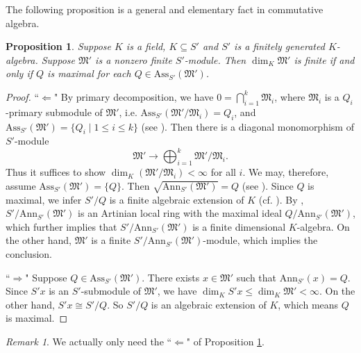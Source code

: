 \documentclass[12pt]{amsart}
\theoremstyle{plain}
\newtheorem{proposition}[theorem]{Proposition}
\theoremstyle{definition}
\theoremstyle{question}
\theoremstyle{remark}
\newtheorem{remark}[theorem]{Remark}
\theoremstyle{assumption}
\numberwithin{equation}{section}
\theoremstyle{bigthm}
\begin{document}
The following proposition is a general and elementary fact in commutative algebra.
\begin{proposition}\label{prop_ideal_dim_zero}
Suppose $K$ is a field, $K \subseteq S'$ and $S'$ is a finitely generated $K$-algebra. Suppose $\mathfrak{M}'$ is a nonzero finite $S'$-module. Then $\dim_{K} \mathfrak{M}'$ is finite if and only if $Q$ is maximal for each $Q \in \mathrm{Ass}_{S'} (\mathfrak{M}')$.
\end{proposition}
\begin{proof}
``$\Leftarrow$" By primary decomposition, we have $0= \bigcap_{i=1}^{k} \mathfrak{M}_{i}$, where $\mathfrak{M}_{i}$ is a $Q_{i}$-primary submodule of $\mathfrak{M}'$, i.e. $\mathrm{Ass}_{S'} (\mathfrak{M}'/\mathfrak{M}_{i}) = Q_{i}$, and $\mathrm{Ass}_{S'} (\mathfrak{M}') = \{ Q_{i} \mid 1 \leq i \leq k \}$ (see \cite[(8.G)]{Matsumura1}). Then there is a diagonal monomorphism of $S'$-module
\[
\mathfrak{M}' \rightarrow \bigoplus_{i=1}^{k} \mathfrak{M}'/\mathfrak{M}_{i}.
\]
Thus it suffices to show $\dim_{K} (\mathfrak{M}'/\mathfrak{M}_{i}) < \infty$ for all $i$. We may, therefore, assume $\mathrm{Ass}_{S'} (\mathfrak{M}') = \{ Q \}$. Then $\sqrt{\mathrm{Ann}_{S'} (\mathfrak{M}')} = Q$ (see \cite[Theorem~6.6]{Matsumura2}). Since $Q$ is maximal, we infer $S'/Q$ is a finite algebraic extension of $K$ (cf. \cite[I.~\S1]{Mumford}). By \cite[Proposition~8.6]{Atiyah_Macdonald}, $S'/ \mathrm{Ann}_{S'} (\mathfrak{M}')$ is an Artinian local ring with the maximal ideal $Q/ \mathrm{Ann}_{S'} (\mathfrak{M}')$, which further implies that $S'/ \mathrm{Ann}_{S'} (\mathfrak{M}')$ is a finite dimensional $K$-algebra. On the other hand, $\mathfrak{M}'$ is a finite $S'/ \mathrm{Ann}_{S'} (\mathfrak{M}')$-module, which implies the conclusion.

``$\Rightarrow$" Suppose $Q \in \mathrm{Ass}_{S'} (\mathfrak{M}')$. There exists $x \in \mathfrak{M}'$ such that $\mathrm{Ann}_{S'} (x) = Q$. Since $S'x$ is an $S'$-submodule of $\mathfrak{M}'$, we have $\dim_{K} S'x \leq \dim_{K} \mathfrak{M}' < \infty$. On the other hand, $S'x \cong S'/Q$. So $S'/Q$ is an algebraic extension of $K$, which means $Q$ is maximal.
\end{proof}

\begin{remark}
We actually only need the ``$\Leftarrow$" of Proposition \ref{prop_ideal_dim_zero}.
\end{remark}

\end{document}
